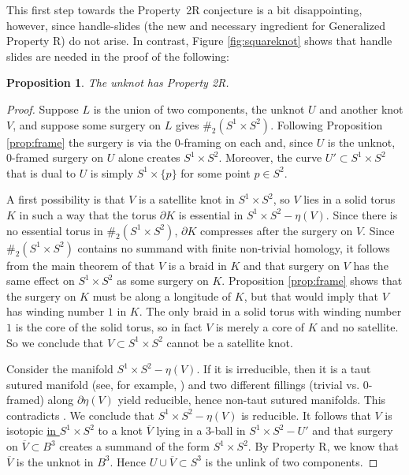 \documentclass{amsart}
\newtheorem{prop}[thm]{Proposition}
\newcommand{\bdd}{\mbox{$\partial$}}
\begin{document}
This first step towards the Property~2R conjecture is a bit disappointing, however, since handle-slides (the new and necessary ingredient for Generalized Property R) do not arise.  In contrast, Figure \ref{fig:squareknot} shows that handle slides are needed in the proof of the following:

\begin{prop}  \label{prop:unknot}  The unknot has Property 2R.
\end{prop}

\begin{proof}  Suppose $L$ is the union of two components,  the unknot $U$ and another knot $V$, and suppose some surgery on $L$ gives $\#_{2} (S^{1} \times S^{2})$.  Following Proposition \ref{prop:frame} the surgery is via the $0$-framing on each and, since $U$ is the unknot, $0$-framed surgery on $U$ alone creates $S^1 \times S^2$.  Moreover, the curve $U' \subset S^1 \times S^2$ that is dual to $U$ is simply $S^1 \times \{ p \}$ for some point $p \in S^2$.

A first possibility is that $V$ is a satellite knot in $S^1 \times S^2$, so $V$ lies in a solid torus $K$ in such a way that the torus $\bdd K$ is essential in $S^1 \times S^2 - \eta(V)$.  Since there is no essential torus in $\#_{2} (S^{1} \times S^{2})$, $\bdd K$ compresses after the surgery on $V$.  Since $\#_{2} (S^{1} \times S^{2})$ contains no summand with finite non-trivial homology, it follows from the main theorem of \cite{Ga3} that $V$ is a braid in $K$ and that surgery on $V$ has the same effect on $S^1 \times S^2$ as some surgery on $K$.  Proposition \ref{prop:frame} shows that the surgery on $K$ must be along a longitude of $K$, but that would imply that $V$ has winding number $1$ in $K$.  The only braid in a solid torus with winding number $1$ is the core of the solid torus, so in fact $V$ is merely a core of $K$ and no satellite.  So we conclude that $V \subset S^1 \times S^2$ cannot be a satellite knot.

Consider the manifold $S^1 \times S^2 - \eta(V)$.  If it is irreducible, then it is a taut sutured manifold (see, for example, \cite{Ga1}) and two different fillings (trivial vs. $0$-framed) along $\bdd \eta(V)$ yield reducible, hence non-taut sutured manifolds.  This contradicts \cite{Ga2}.  We conclude that $S^1 \times S^2 - \eta(V)$ is reducible.  It follows that $V$ is isotopic \underline{in $S^1 \times S^2$} to a knot $\overline{V}$ lying in a $3$-ball in $S^1 \times S^2 - U'$ and that surgery on $\overline{V} \subset B^3$ creates a summand of the form $S^1 \times S^2$.  By Property R, we know that $\overline{V}$ is the unknot in $B^3$.  Hence $U \cup \overline{V} \subset S^3$ is the unlink of two components.


\end{proof}
\end{document}
